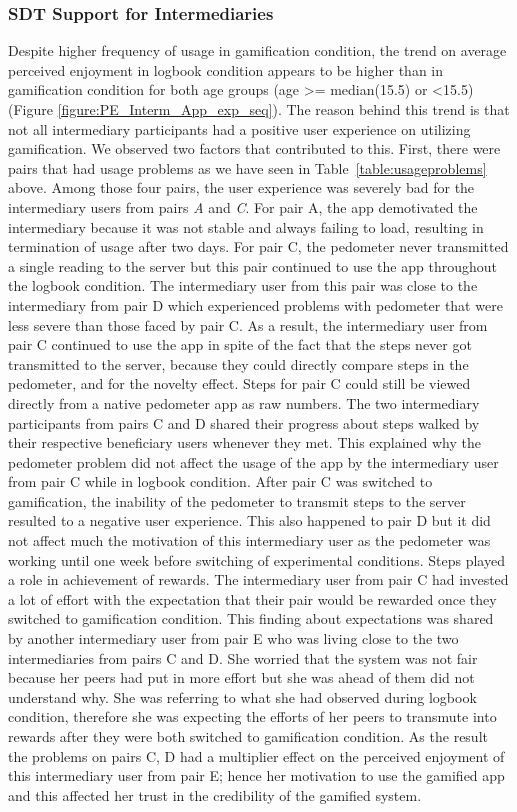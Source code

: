\documentclass{sig-alternate}
\begin{document}
\subsubsection{{SDT Support for Intermediaries}}  
Despite higher frequency of usage in gamification condition, the trend on average perceived enjoyment in logbook condition appears to be higher than in gamification condition for both age groups (age \textgreater = median(15.5) or \textless 15.5) (Figure \ref{figure:PE_Interm_App_exp_seq}). The reason behind this trend is that not all intermediary participants had a positive user experience on utilizing gamification. We observed two factors that contributed  to this. First, there were pairs that had usage problems as we have seen in Table~\ref{table:usageproblems} above. Among those four pairs, the user experience was severely bad for the intermediary users from pairs \emph{A} and \emph{C}. For pair A, the app demotivated the intermediary because it was not stable and always failing to load, resulting in termination of usage after two days. For pair C, the pedometer never transmitted a single reading to the server but this pair continued to use the app throughout the logbook condition. The intermediary user from this pair was close to the intermediary from pair D which experienced problems with pedometer that were less severe than those faced by pair C. As a result, the intermediary user from pair C continued to use the app in spite of the fact that the steps never got transmitted to the server, because they could directly compare steps in the pedometer, and for the novelty effect. Steps for pair C could still be viewed directly from a native pedometer app as raw numbers. The two intermediary participants from pairs C and D shared their progress about steps walked by their respective beneficiary users whenever they met. This explained why the pedometer problem did not affect the usage of the app by the intermediary user from pair C while in logbook condition. After pair C was switched to gamification, the inability of the pedometer to transmit steps to the server resulted to a negative user experience. This also happened to pair D but it did not affect much the motivation of this intermediary user as the pedometer was working until one week before switching of experimental conditions. Steps played a role in achievement of rewards. The intermediary user from pair C had invested a lot of effort with the expectation that their pair would be rewarded once they switched to gamification condition. This finding about expectations was shared by another intermediary user from pair E who was living close  to the two intermediaries from pairs C and D. She worried that the system was not fair because her peers had put in more effort but she was ahead of them did not understand why. She was referring to what she had observed during logbook condition,  therefore she was expecting the efforts of her peers to transmute into rewards after they were both switched to gamification condition. As the result the problems on pairs C, D had a multiplier  effect on the perceived enjoyment of this intermediary user from pair E; hence her motivation to use the gamified app and this affected her trust in the credibility of the gamified system.
\end{document}
